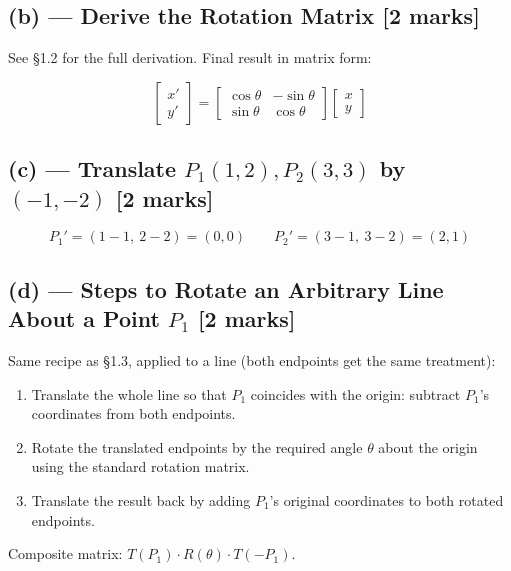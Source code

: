 \documentclass[12pt, a4paper]{article}
\newenvironment{answerbox}{\begin{mdframed}[style=answerframe]}{\end{mdframed}}
\begin{document}
\subsection*{(b) --- Derive the Rotation Matrix [2 marks]}
See \S1.2 for the full derivation. Final result in matrix form:
\begin{answerbox}
$$\begin{bmatrix}x'\\y'\end{bmatrix} = \begin{bmatrix}\cos\theta & -\sin\theta\\ \sin\theta & \cos\theta\end{bmatrix}\begin{bmatrix}x\\y\end{bmatrix}$$
\end{answerbox}

\subsection*{(c) --- Translate $P_1(1,2), P_2(3,3)$ by $(-1,-2)$ [2 marks]}
\begin{answerbox}
$$P_1' = (1-1,\ 2-2) = (0,0) \qquad P_2' = (3-1,\ 3-2) = (2,1)$$
\end{answerbox}

\subsection*{(d) --- Steps to Rotate an Arbitrary Line About a Point $P_1$ [2 marks]}
\begin{answerbox}
Same recipe as \S1.3, applied to a line (both endpoints get the same treatment):
\begin{enumerate}[noitemsep]
  \item Translate the whole line so that $P_1$ coincides with the origin: subtract $P_1$'s coordinates from both endpoints.
  \item Rotate the translated endpoints by the required angle $\theta$ about the origin using the standard rotation matrix.
  \item Translate the result back by adding $P_1$'s original coordinates to both rotated endpoints.
\end{enumerate}
Composite matrix: $T(P_1)\cdot R(\theta)\cdot T(-P_1)$.
\end{answerbox}
\end{document}
